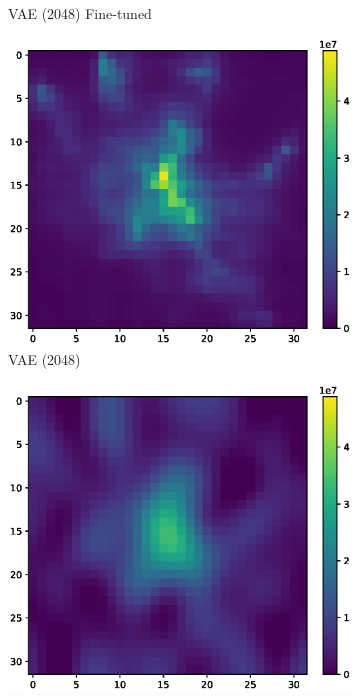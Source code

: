 \begin{figure}
\begin{subfigure}[b]{0.32\textwidth}
        \caption{VAE (2048) Fine-tuned}
    \end{subfigure}
    \begin{subfigure}[b]{0.32\textwidth}
        \includegraphics[width=\textwidth]{figures/06_results/gaussian_plume_example/munich/gen_2048_20_db.eps}
        \caption{VAE (2048)}
    \end{subfigure}
    \begin{subfigure}[b]{0.32\textwidth}
        \includegraphics[width=\textwidth]{figures/06_results/gaussian_plume_example/munich/bp_dct_snr_20_db.eps}

\end{subfigure}
\end{figure}
